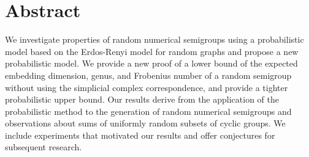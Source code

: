 \chapter*{Abstract}

We investigate properties of random numerical semigroups using a probabilistic model based on the Erdos-Renyi model for random graphs and propose a new probabilistic model. We provide a new proof of a lower bound of the expected embedding dimension, genus, and Frobenius number of a random semigroup without using the simplicial complex correspondence, and provide a tighter probabilistic upper bound. Our results derive from the application of the probabilistic method to the generation of random numerical semigroups and observations about sums of uniformly random subsets of cyclic groups. We include experiments that motivated our results and offer conjectures for subsequent research.